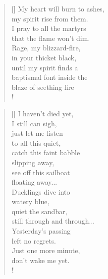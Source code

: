\documentclass[]{article}
\begin{document}
\vspace*{0.0725\textheight}
\settowidth{\versewidth}{My heart will burn to ash}
\begin{verse}[\versewidth]
My heart will burn to ashes,\\
my spirit rise from them.\\
I pray to all the martyrs\\
that the flame won't dim.\\
Rage, my blizzard-fire,\\
in your thicket black,\\
until my spirit finds a\\
baptismal font inside the\\
blaze of seething fire\\!
\end{verse}
\bigskip \bigskip \bigskip

\settowidth{\versewidth}{I haven't died yet,} 
\begin{verse}[\versewidth]
I haven't died yet,\\
I still can sigh,\\
just let me listen\\
to all this quiet,\\
catch this faint babble\\
slipping away,\\
see off this sailboat\\
floating away...\\
Ducklings dive into\\
watery blue,\\
quiet the sandbar,\\
still through and through...\\
Yesterday's passing\\
left no regrets.\\
Just one more minute,\\
don't wake me yet.\\!
\end{verse}
\newpage
\end{document}
